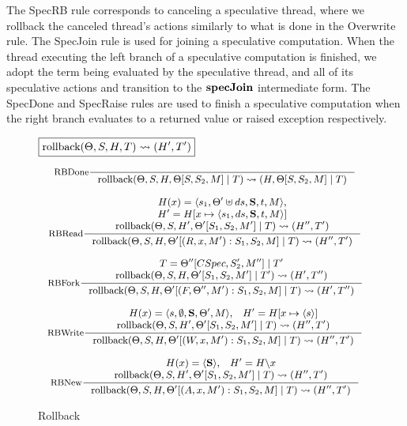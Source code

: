 The SpecRB rule corresponds to canceling a speculative thread, where we rollback the canceled thread's actions similarly to what is done in the Overwrite rule.  The SpecJoin rule is used for joining a speculative computation.  When the thread executing the left branch of a speculative computation is finished, we adopt the term being evaluated by the speculative thread, and all of its speculative actions and transition to the $\text{\bf specJoin}$ intermediate form.  The SpecDone and SpecRaise rules are used to finish a speculative computation when the right branch evaluates to a  returned value or raised exception respectively. 

\begin{figure}
$\boxed{\text{rollback}(\Theta, S, H, T) \leadsto (H' ,T')}$

\[%
\mbox{\small
\inference[\text{RBDone}]{}{\rollback(\Theta, S, H, \Theta[S, S_2, M] \; | \; T) \leadsto (H, \Theta[S, S_2, M] \; | \; T)}
}
\]

\[%
\mbox{\small
\inference[\text{RBRead}]{H(x) = \langle s_1, \Theta' \uplus ds, \spec, t, M\rangle, \\ H' = H[x \mapsto \langle s_1, ds, \spec, t, M\rangle] \\ \rollback(\Theta, S, H', \Theta'[S_1, S_2, M'] \; | \; T) \leadsto (H'', T')}{\rollback(\Theta, S, H, \Theta'[(R, x, M') : S_1, S_2, M] \; | \; T) \leadsto (H'', T')}
}
\]

\[%
\mbox{\small
\inference[\text{RBFork}]{T = \Theta''[CSpec, S_2', M''] \; | \; T' \\ \rollback(\Theta, S, H, \Theta'[S_1, S_2, M'] \; | \; T') \leadsto (H', T'')}{\rollback(\Theta, S, H, \Theta'[(F, \Theta'', M') : S_1, S_2, M] \; | \; T) \leadsto (H', T'')}
}
\]

\[%
\mbox{\small
\inference[\text{RBWrite}]{H(x) = \langle s, \emptyset, \spec, \Theta', M\rangle, \;\;\;  H' = H[x \mapsto \langle s \rangle] \\ \rollback(\Theta, S, H', \Theta'[S_1, S_2, M'] \; | \; T) \leadsto (H'', T')}{\rollback(\Theta, S, H, \Theta'[(W, x, M') : S_1, S_2, M] \; | \; T) \leadsto (H'', T')}
}
\]

\[%
\mbox{\small
\inference[\text{RBNew}]{H(x) = \langle \spec \rangle, \;\;\; H' = H \backslash x \\ \rollback(\Theta, S, H', \Theta'[S_1, S_2, M'] \; | \; T) \leadsto (H'', T')}{\rollback(\Theta, S, H, \Theta'[(A, x, M') : S_1, S_2, M] \; | \; T) \leadsto (H'', T')}
}
\]

\caption{Rollback}
\label{fig:rollback}
\end{figure}

